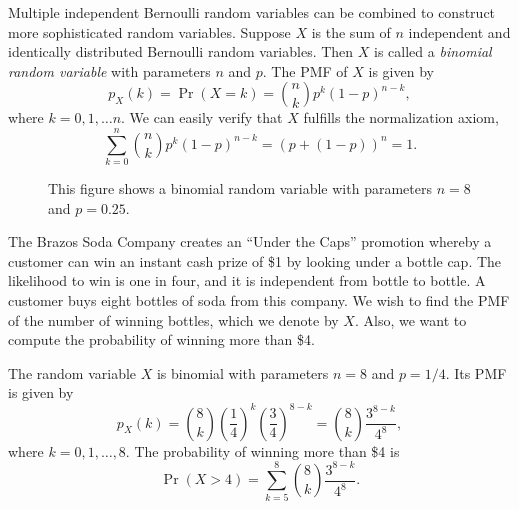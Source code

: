 Multiple independent Bernoulli random variables can be combined to construct more sophisticated random variables.
Suppose $X$ is the sum of $n$ independent and identically distributed Bernoulli random variables.
Then $X$ is called a \emph{binomial random variable} with parameters $n$ and $p$. 
The PMF of $X$ is given by
\begin{equation*}
p_X (k) = \Pr (X = k)
= \binom{n}{k} p^k (1-p)^{n-k},
\end{equation*}
where $k = 0, 1, \ldots n$.
We can easily verify that $X$ fulfills the normalization axiom,
\begin{equation*}
\sum_{k=0}^n \binom{n}{k} p^k (1-p)^{n-k}
= \left( p + (1-p) \right)^n = 1.
\end{equation*}

\begin{figure}[ht]
\begin{center}
\end{center}
\caption{This figure shows a binomial random variable with parameters $n = 8$ and $p = 0.25$.}
\end{figure}

\begin{example} \label{BrazosSodaCompany1}
The Brazos Soda Company creates an ``Under the Caps'' promotion whereby a customer can win an instant cash prize of \$1 by looking under a bottle cap.
The likelihood to win is one in four, and it is independent from bottle to bottle.
A customer buys eight bottles of soda from this company.
We wish to find the PMF of the number of winning bottles, which we denote by $X$.
Also, we want to compute the probability of winning more than \$4.

The random variable $X$ is binomial with parameters $n = 8$ and $p = 1/4$.
Its PMF is given by
\begin{equation*}
p_X (k) = \binom{8}{k} \left( \frac{1}{4} \right)^k
\left( \frac{3}{4} \right)^{8-k}
= \binom{8}{k} \frac{3^{8-k}}{4^8} ,
\end{equation*}
where $k = 0, 1, \ldots, 8$.
The probability of winning more than \$4 is
\begin{equation*}
\Pr (X > 4)
= \sum_{k=5}^{8} \binom{8}{k} \frac{3^{8-k}}{4^8} .
\end{equation*}
\end{example}


